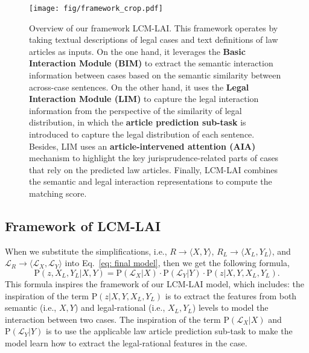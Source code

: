 \begin{figure*}[t]
\centering
\texttt{[image: fig/framework\_crop.pdf]}
\caption{
Overview of our framework LCM-LAI. 
This framework operates by taking textual descriptions of legal cases and text definitions of law articles as inputs. 
On the one hand, it leverages the \textbf{Basic Interaction Module (BIM)} to extract the semantic interaction information between cases based on the semantic similarity between across-case sentences. 
On the other hand, it uses the \textbf{Legal Interaction Module (LIM)} to capture the legal interaction information from the perspective of the similarity of legal distribution, in which the \textbf{article prediction sub-task} is introduced to capture the legal distribution of each sentence.
Besides, LIM uses an \textbf{article-intervened attention (AIA)} mechanism to highlight the key jurisprudence-related parts of cases that rely on the predicted law articles.
Finally, LCM-LAI combines the semantic and legal interaction representations to compute the matching score.
}
\label{fig: framework}
\end{figure*}

\subsection{Framework of LCM-LAI} \label{subsec: framework}
When we substitute the simplifications, i.e., $R \rightarrow \langle X, Y \rangle$, $R_L \rightarrow \langle X_L, Y_L \rangle$, and $\mathcal{L}_R \rightarrow \langle \mathcal{L}_X, \mathcal{L}_Y \rangle$ into Eq.~\ref{eq: final model}, then we get the following formula,
\begin{equation} \label{eq: model framework}
\mathrm{P}(z, X_L, Y_L | X, Y ) = \mathrm{P}(\mathcal{L}_X|X) \cdot \mathrm{P}(\mathcal{L}_Y|Y) 
\cdot \mathrm{P}(z| X, Y, X_L, Y_L).
\end{equation}
This formula inspires the framework of our LCM-LAI model, which includes: the inspiration of the term $\mathrm{P}(z|X, Y, X_L, Y_L)$ is to extract the features from both semantic (i.e., $X, Y$) and legal-rational (i.e., $X_L, Y_L$) levels to model the interaction between two cases. The inspiration of the term $\mathrm{P}(\mathcal{L}_X|X)$ and $\mathrm{P}(\mathcal{L}_Y|Y)$ is to use the applicable law article prediction sub-task to make the model learn how to extract the legal-rational features in the case.

